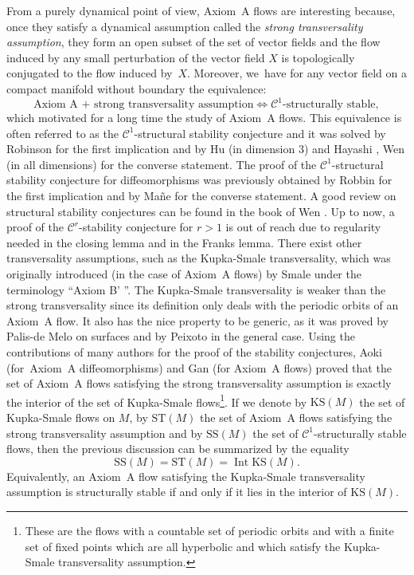\documentclass[11pt]{article}
\newcommand{\KS}{\mathrm{KS}}
\newcommand{\rSS}{\mathrm{SS}}
\newcommand{\ST}{\mathrm{ST}}
\theoremstyle{definition}
\theoremstyle{plain}
\newcommand{\Ccal}{\mathcal{C}}
\DeclareMathOperator{\Int}{Int}
\begin{document}
From a purely dynamical point of view, Axiom~A flows are interesting because, once they satisfy a dynamical assumption called the \textit{strong transversality assumption}, they form an open subset of the set of vector fields and the flow induced by any small perturbation of the vector field $X$ is topologically conjugated to the flow induced by~$X$. Moreover, we~have for any vector field on a compact manifold without boundary the equivalence:
\[
\text{Axiom~A + strong transversality assumption} \iff \text{$\Ccal^1$-structurally stable},
\]
which motivated for a long time the study of Axiom~A flows. This equivalence is often referred to as the $\Ccal^1$-structural stability conjecture and it was solved by Robinson \cite{robinson} for the first implication and by Hu \cite{hu} (in dimension $3$) and Hayashi \cite{hayashi}, Wen \cite{wen} (in all dimensions) for the converse statement. The proof of the $\Ccal^1$-structural stability conjecture for diffeomorphisms was previously obtained by Robbin \cite{robbin} for the first implication and by Ma\~{n}e \cite{mane} for the converse statement. A good review on structural stability conjectures can be found in the book of Wen \cite{wen-book}. Up to now, a proof of the $\Ccal^r$-stability conjecture for $r > 1$ is out of reach due to regularity needed in the closing lemma and in the Franks lemma. There exist other transversality assumptions, such as the Kupka-Smale transversality, which was originally introduced (in the case of Axiom~A flows) by Smale under the terminology ``Axiom B' ''. The Kupka-Smale transversality is weaker than the strong transversality since its definition only deals with the periodic orbits of an Axiom~A flow. It also has the nice property to be generic, as it was proved by Palis-de Melo \cite{palis-demelo} on surfaces and by Peixoto \cite{peixoto} in the general case. Using the contributions of many authors for the proof of the stability conjectures, Aoki \cite{aoki} (for~Axiom~A diffeomorphisms) and Gan \cite{gan} (for Axiom~A flows) proved that the set of Axiom~A flows satisfying the strong transversality assumption is exactly the interior of the set of Kupka-Smale flows\footnote{These are the flows with a countable set of periodic orbits and with a finite set of fixed points which are all hyperbolic and which satisfy the Kupka-Smale transversality assumption.}. If we denote by $\KS(M)$ the set of Kupka-Smale flows on $M$, by $\ST(M)$ the set of Axiom~A flows satisfying the strong transversality assumption and by $\rSS(M)$ the set of $\Ccal^1$-structurally stable flows, then the previous discussion can be summarized by the equality
\[
\rSS(M) = \ST(M) = \Int \KS(M).
\]
Equivalently, an Axiom~A flow satisfying the Kupka-Smale transversality assumption is structurally stable if and only if it lies in the interior of $\KS(M)$.
\end{document}

